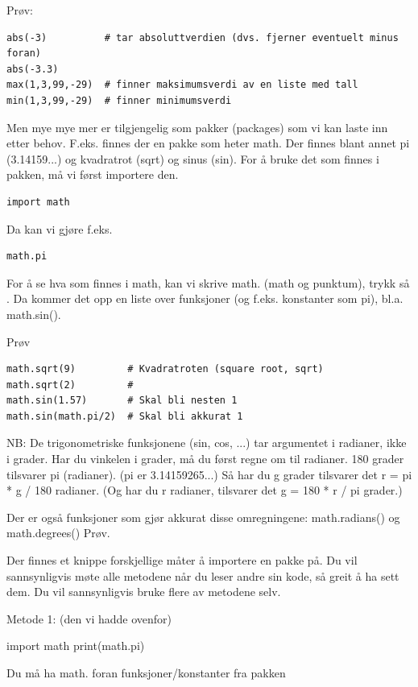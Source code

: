 {Prøv:
\begin{lstlisting}
abs(-3)          # tar absoluttverdien (dvs. fjerner eventuelt minus foran)
abs(-3.3)
max(1,3,99,-29)  # finner maksimumsverdi av en liste med tall
min(1,3,99,-29)  # finner minimumsverdi 
\end{lstlisting}

Men mye mye mer er tilgjengelig som pakker (packages) som vi kan laste inn etter behov. F.eks. finnes der en pakke som heter math. Der finnes blant annet pi (3.14159...) og kvadratrot (sqrt) og sinus (sin). For å bruke det som finnes i pakken, må vi først importere den.

\begin{lstlisting}
import math
\end{lstlisting}

Da kan vi gjøre f.eks.

\begin{lstlisting}
math.pi
\end{lstlisting}

For å se hva som finnes i math, kan vi skrive math. (math og punktum), trykk så . Da kommer det opp en liste over funksjoner (og f.eks. konstanter som pi), bl.a. math.sin().

Prøv
\begin{lstlisting}
math.sqrt(9)         # Kvadratroten (square root, sqrt)
math.sqrt(2)         # 
math.sin(1.57)       # Skal bli nesten 1
math.sin(math.pi/2)  # Skal bli akkurat 1
\end{lstlisting}

NB: De trigonometriske funksjonene (sin, cos, ...) tar argumentet i radianer, ikke i grader. Har du vinkelen i grader, må du først regne om til radianer. 180 grader tilsvarer pi (radianer). (pi er 3.14159265...) Så har du g grader tilsvarer det r = pi * g / 180  radianer. (Og har du r radianer, tilsvarer det g = 180 * r / pi  grader.) 

Der er også funksjoner som gjør akkurat disse omregningene:  math.radians() og math.degrees() Prøv.

Der finnes et knippe forskjellige måter å importere en pakke på. Du vil sannsynligvis møte alle metodene når du leser andre sin kode, så greit å ha sett dem. Du vil sannsynligvis bruke flere av metodene selv.

Metode 1: (den vi hadde ovenfor)
\begin{usncodebox}
import math
print(math.pi)
\end{usncodebox}
Du må ha math. foran funksjoner/konstanter fra pakken

}

